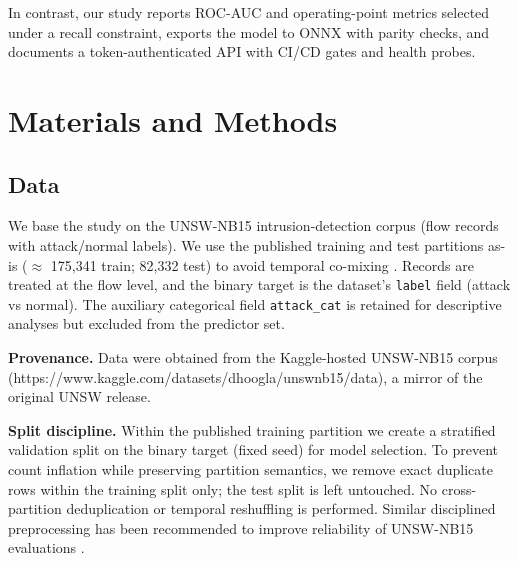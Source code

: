 \documentclass{article}
\begin{document}
In contrast, our study reports ROC-AUC and operating-point metrics selected under a recall constraint, exports the model to ONNX with parity checks, and documents a token-authenticated API with CI/CD gates and health probes.

\section{Materials and Methods}
\subsection{Data}
We base the study on the UNSW-NB15 intrusion-detection corpus (flow records with attack/normal labels). We use the published training and test partitions as-is ($\approx$ 175,341 train; 82,332 test) to avoid temporal co-mixing \cite{meftah2019}. Records are treated at the flow level, and the binary target is the dataset’s \texttt{label} field (attack vs normal). The auxiliary categorical field \texttt{attack\_cat} is retained for descriptive analyses but excluded from the predictor set.

\textbf{Provenance.} Data were obtained from the Kaggle-hosted UNSW-NB15 corpus (https://www.kaggle.com/datasets/dhoogla/unswnb15/data), a mirror of the original UNSW release.

\textbf{Split discipline.} Within the published training partition we create a stratified validation split on the binary target (fixed seed) for model selection. To prevent count inflation while preserving partition semantics, we remove exact duplicate rows within the training split only; the test split is left untouched. No cross-partition deduplication or temporal reshuffling is performed. Similar disciplined preprocessing has been recommended to improve reliability of UNSW-NB15 evaluations \cite{kocher2020}.
\end{document}
